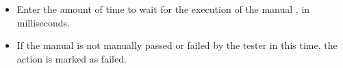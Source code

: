 
\begin{itemize}
\item Enter the amount of time to wait for the execution of the manual \gdstep{}, in milliseconds.
\item If the manual \gdstep{} is not manually passed or failed by the tester in this time, the action is marked as failed. 
\end{itemize}
